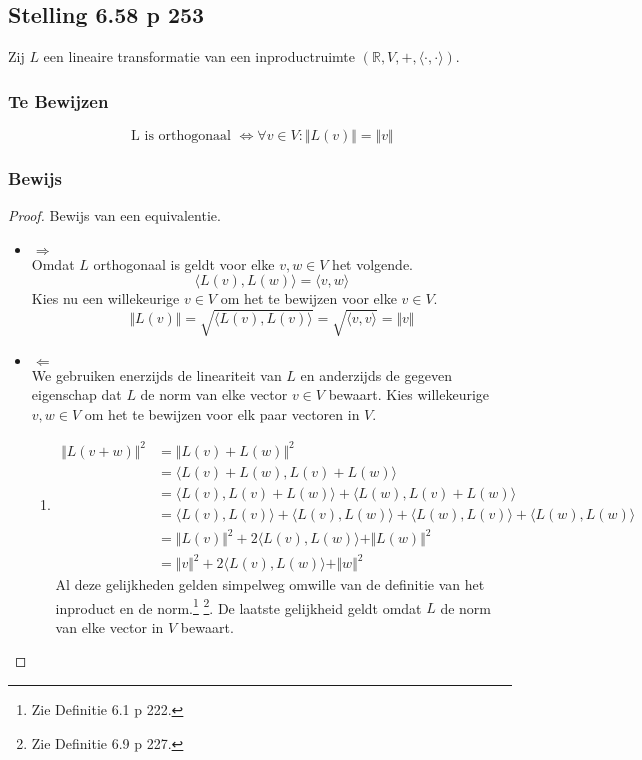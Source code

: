 \documentclass[lineaire_algebra_oplossingen.tex]{subfiles}
\begin{document}
\subsection{Stelling 6.58 p 253}
\label{6.58}
Zij $L$ een lineaire transformatie van een inproductruimte $(\mathbb{R},V,+,\langle \cdot,\cdot \rangle)$.

\subsubsection*{Te Bewijzen}
\[
\text{ L is orthogonaal } \Leftrightarrow \forall v \in V: \Vert L(v) \Vert = \Vert v\Vert
\]

\subsubsection*{Bewijs}
\begin{proof}
Bewijs van een equivalentie.
\begin{itemize}
\item $\Rightarrow$\\
Omdat $L$ orthogonaal is geldt voor elke $v,w \in V$ het volgende.
\[
\langle L(v), L(w) \rangle = \langle v,w\rangle
\]
Kies nu een willekeurige $v \in V$ om het te bewijzen voor elke $v\in V$.
\[
\Vert L(v) \Vert = \sqrt{\langle L(v), L(v) \rangle} = \sqrt{\langle v, v \rangle} = \Vert v\Vert
\]

\item $\Leftarrow$\\
We gebruiken enerzijds de lineariteit van $L$ en anderzijds de gegeven eigenschap dat $L$ de norm van elke vector $v \in V$ bewaart. Kies willekeurige $v,w \in V$ om het te bewijzen voor elk paar vectoren in $V$.
\begin{enumerate}
\item
\begin{align*}
\Vert L(v+w) \Vert^2
&= \Vert L(v)+L(w) \Vert^2 \\
&= \langle L(v)+L(w),L(v)+L(w) \rangle \\
&= \langle L(v),L(v)+L(w) \rangle + \langle L(w),L(v)+L(w) \rangle \\
&= \langle L(v),L(v) \rangle + \langle L(v),L(w) \rangle + \langle L(w),L(v) \rangle +\langle L(w),L(w) \rangle \\
&= \Vert L(v)\Vert^2 + 2\langle L(v),L(w) \rangle +\Vert L(w)\Vert^2 \\
&= \Vert v\Vert^2 + 2\langle L(v),L(w) \rangle +\Vert w\Vert^2
\end{align*}
Al deze gelijkheden gelden simpelweg omwille van de definitie van het inproduct en de norm.\footnote{Zie Definitie 6.1 p 222.} \footnote{Zie Definitie 6.9 p 227.}. De laatste gelijkheid geldt omdat $L$ de norm van elke vector in $V$ bewaart.


\end{enumerate}
\end{itemize}
\end{proof}
\end{document}
